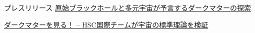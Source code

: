\begin{rSection}{プレスリリース}
    \href{https://www.ipmu.jp/ja/20201224-PBH-multiverse}{原始ブラックホールと多元宇宙が予言するダークマターの探索}
  
    \href{https://www.ipmu.jp/ja/20230404-darkmatter}{ダークマターを見る！ – HSC国際チームが宇宙の標準理論を検証}
\end{rSection}